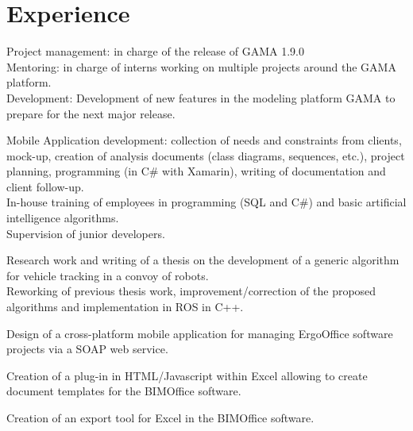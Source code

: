 \documentclass[letterpaper]{twentysecondcv - EN} %
\begin{document}

\section{Experience}

\begin{twenty}

	{
		Project management: in charge of the release of GAMA 1.9.0\\
		Mentoring: in charge of interns working on multiple projects around the GAMA platform.\\
		 Development: Development of new features in the modeling platform GAMA to prepare for the next major release.
	}
	
	{ 
		Mobile Application development: collection of needs and constraints from clients, mock-up, creation of analysis documents (class diagrams, sequences, etc.), project planning, programming (in C\# with Xamarin), writing of documentation and client follow-up.\\
		In-house training of employees in programming (SQL and C\#) and basic artificial intelligence algorithms. \\
		Supervision of junior developers.
	}
	 
	{
		Research work and writing of a thesis on the development of a generic algorithm for vehicle tracking in a convoy of robots. \\
		Reworking of previous thesis work, improvement/correction of the proposed algorithms and implementation in ROS in C++.
	}
	
	{
		Design of a cross-platform mobile application for managing ErgoOffice software projects via a SOAP web service.
	}
	
	{
		Creation of a plug-in in HTML/Javascript within Excel allowing to create document templates for the BIMOffice software.
	}

	
	{
		Creation of an export tool for Excel in the BIMOffice software.
	}

\end{twenty}
\end{document}
